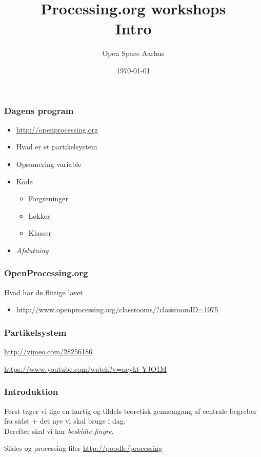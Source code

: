 \documentclass{beamer}
\title{Processing.org workshops\\Intro}
\author{Open Space Aarhus}
\date{\today}
\institute[Bryggervej 30]{Bryggervej 30, 8240 Århus N}
\begin{document}
\begin{frame}[label=titlepage]
  \titlepage
\end{frame}

\begin{frame}
  \frametitle{Dagens program}
  \begin{itemize}
  \item \url{http://openprocessing.org}
  \item Hvad er et partikelsystem
  \item Opsumering variable
  \item Kode
    \begin{itemize}
    \item Forgreninger
    \item Løkker
    \item Klasser
    \end{itemize}

  \item \emph{Afslutning}
    
  \end{itemize}						
\end{frame}


\begin{frame}
  \frametitle{OpenProcessing.org}
  \begin{block}{Hvad har de flittige lavet}
    \begin{itemize}
    \item \url{http://www.openprocessing.org/classrooms/?classroomID=1075}
    \end{itemize}
  \end{block}
\end{frame}



\begin{frame}
  \frametitle{Partikelsystem}

  \url{http://vimeo.com/28256186}  

  \url{https://www.youtube.com/watch?v=ncykt-YJO1M}
\end{frame}


\begin{frame}
  \frametitle{Introduktion}
  
  Først tager vi lige en hurtig og tildels teoretisk gennemgang af
  centrale begreber fra sidst + det nye vi skal bruge i dag. \\
  \vspace{2cm}
  Derefter skal vi har \emph{beskidte fingre}.

  \begin{block}{Slides og processing filer}
    \url{http://poodle/processing}   
  \end{block}

\end{frame}
\end{document}
